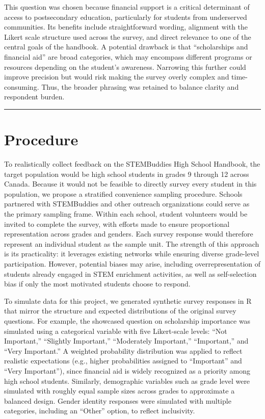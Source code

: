 \documentclass[
  letterpaper,
  DIV=11,
  numbers=noendperiod]{scrartcl}
\begin{document}
This question was chosen because financial support is a critical
determinant of access to postsecondary education, particularly for
students from underserved communities. Its benefits include
straightforward wording, alignment with the Likert scale structure used
across the survey, and direct relevance to one of the central goals of
the handbook. A potential drawback is that ``scholarships and financial
aid'' are broad categories, which may encompass different programs or
resources depending on the student's awareness. Narrowing this further
could improve precision but would risk making the survey overly complex
and time-consuming. Thus, the broader phrasing was retained to balance
clarity and respondent burden.

\begin{center}\rule{0.5\linewidth}{0.5pt}\end{center}

\section{Procedure}\label{procedure}

To realistically collect feedback on the STEMBuddies High School
Handbook, the target population would be high school students in grades
9 through 12 across Canada. Because it would not be feasible to directly
survey every student in this population, we propose a stratified
convenience sampling procedure. Schools partnered with STEMBuddies and
other outreach organizations could serve as the primary sampling frame.
Within each school, student volunteers would be invited to complete the
survey, with efforts made to ensure proportional representation across
grades and genders. Each survey response would therefore represent an
individual student as the sample unit. The strength of this approach is
its practicality: it leverages existing networks while ensuring diverse
grade-level participation. However, potential biases may arise,
including overrepresentation of students already engaged in STEM
enrichment activities, as well as self-selection bias if only the most
motivated students choose to respond.

To simulate data for this project, we generated synthetic survey
responses in R that mirror the structure and expected distributions of
the original survey questions. For example, the showcased question on
scholarship importance was simulated using a categorical variable with
five Likert-scale levels: ``Not Important,'' ``Slightly Important,''
``Moderately Important,'' ``Important,'' and ``Very Important.'' A
weighted probability distribution was applied to reflect realistic
expectations (e.g., higher probabilities assigned to ``Important'' and
``Very Important''), since financial aid is widely recognized as a
priority among high school students. Similarly, demographic variables
such as grade level were simulated with roughly equal sample sizes
across grades to approximate a balanced design. Gender identity
responses were simulated with multiple categories, including an
``Other'' option, to reflect inclusivity.
\end{document}
